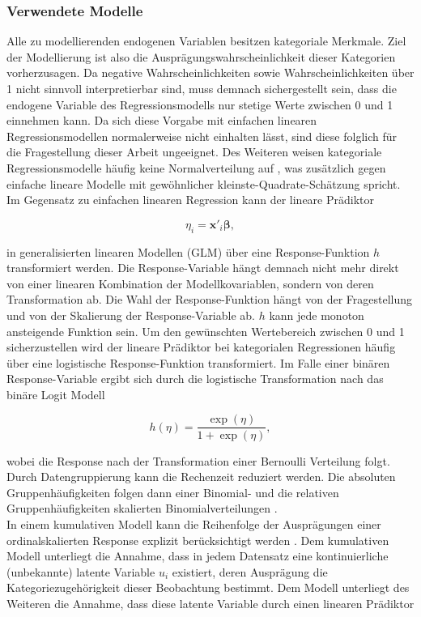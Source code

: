 \documentclass{Vorlage}
\begin{document}
\subsubsection{Verwendete Modelle}
Alle zu modellierenden endogenen Variablen besitzen kategoriale Merkmale. Ziel der Modellierung ist also  die Ausprägungswahrscheinlichkeit dieser Kategorien vorherzusagen. Da negative Wahrscheinlichkeiten sowie Wahrscheinlichkeiten über 1 nicht sinnvoll interpretierbar sind, muss demnach sichergestellt sein, dass die endogene Variable des Regressionsmodells nur stetige Werte zwischen 0 und 1 einnehmen kann. Da sich diese Vorgabe mit einfachen linearen Regressionsmodellen normalerweise nicht einhalten lässt, sind diese folglich für die Fragestellung dieser Arbeit ungeeignet. Des Weiteren weisen kategoriale Regressionsmodelle häufig keine Normalverteilung auf \cite[p. 277]{fahrmeir2013regression}, was zusätzlich gegen einfache lineare Modelle mit gewöhnlicher kleinste-Quadrate-Schätzung spricht. Im Gegensatz zu einfachen linearen Regression kann der lineare Prädiktor


\begin{equation} \label{linPraed}
\eta_{i} =\mathbf{x}'_i \boldsymbol{\beta},
\end{equation}

in generalisierten linearen Modellen (GLM) über eine Response-Funktion $h$ transformiert werden. Die Response-Variable hängt demnach nicht mehr direkt von einer linearen Kombination der Modellkovariablen, sondern von deren Transformation ab. Die Wahl der Response-Funktion hängt von der Fragestellung und von der Skalierung der Response-Variable ab. $h$ kann jede monoton ansteigende Funktion sein. Um den gewünschten Wertebereich zwischen 0 und 1 sicherzustellen wird der lineare Prädiktor bei kategorialen Regressionen häufig über eine logistische Response-Funktion transformiert. Im Falle einer binären Response-Variable ergibt sich durch die logistische Transformation nach \cite[p. 270 f.]{fahrmeir2013regression} das binäre Logit Modell

\begin{equation} \label{logit}
h(\eta)=\frac{\exp(\eta)}{1+\exp(\eta)},
\end{equation}

wobei die Response nach der Transformation einer Bernoulli Verteilung folgt. Durch Datengruppierung kann die Rechenzeit reduziert werden. Die absoluten Gruppenhäufigkeiten folgen dann einer Binomial- und die relativen Gruppenhäufigkeiten skalierten Binomialverteilungen \cite[p. 277 f.]{fahrmeir2013regression}.\\
In einem kumulativen Modell kann die Reihenfolge der Ausprägungen einer ordinalskalierten Response explizit berücksichtigt werden \cite[p.334 ff.]{fahrmeir2013regression}. Dem kumulativen Modell unterliegt die Annahme, dass in jedem Datensatz eine kontinuierliche (unbekannte) latente Variable $u_i$ existiert, deren Ausprägung die Kategoriezugehörigkeit dieser Beobachtung bestimmt. Dem Modell unterliegt des Weiteren die Annahme, dass diese latente Variable durch einen linearen Prädiktor
\end{document}
